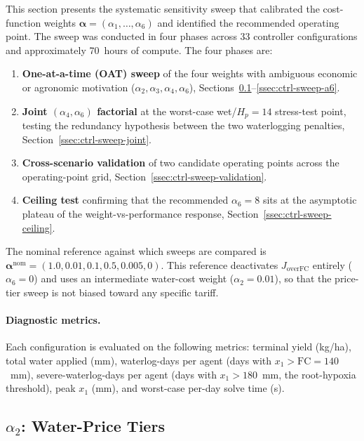 This section presents the systematic sensitivity sweep that calibrated the
cost-function weights $\boldsymbol{\alpha} = (\alpha_1, \ldots, \alpha_6)$
and identified the recommended operating point. The sweep was conducted in
four phases across 33 controller configurations and approximately 70~hours
of compute. The four phases are:
\begin{enumerate}
  \item \textbf{One-at-a-time (OAT) sweep} of the four weights with
    ambiguous economic or agronomic motivation ($\alpha_2, \alpha_3,
    \alpha_4, \alpha_6$), Sections~\ref{ssec:ctrl-sweep-a2}--\ref{ssec:ctrl-sweep-a6}.
  \item \textbf{Joint $(\alpha_4, \alpha_6)$ factorial} at the worst-case
    wet/$H_p=14$ stress-test point, testing the redundancy hypothesis between
    the two waterlogging penalties, Section~\ref{ssec:ctrl-sweep-joint}.
  \item \textbf{Cross-scenario validation} of two candidate operating points
    across the operating-point grid, Section~\ref{ssec:ctrl-sweep-validation}.
  \item \textbf{Ceiling test} confirming that the recommended $\alpha_6 = 8$
    sits at the asymptotic plateau of the weight-vs-performance response,
    Section~\ref{ssec:ctrl-sweep-ceiling}.
\end{enumerate}

The nominal reference against which sweeps are compared is
$\boldsymbol{\alpha}^{\mathrm{nom}} = (1.0, 0.01, 0.1, 0.5, 0.005, 0)$.
This reference deactivates $J_{\mathrm{overFC}}$ entirely ($\alpha_6 = 0$)
and uses an intermediate water-cost weight ($\alpha_2 = 0.01$), so that the
price-tier sweep is not biased toward any specific tariff.

\paragraph{Diagnostic metrics.} Each configuration is evaluated on the
following metrics: terminal yield (kg/ha), total water applied (mm),
waterlog-days per agent (days with $x_1 > \mathrm{FC} = 140$~mm),
severe-waterlog-days per agent (days with $x_1 > 180$~mm, the root-hypoxia
threshold), peak $x_1$ (mm), and worst-case per-day solve time (s).

\subsection{\texorpdfstring{$\alpha_2$: Water-Price Tiers}{Alpha2: Water-Price Tiers}}
\label{ssec:ctrl-sweep-a2}

